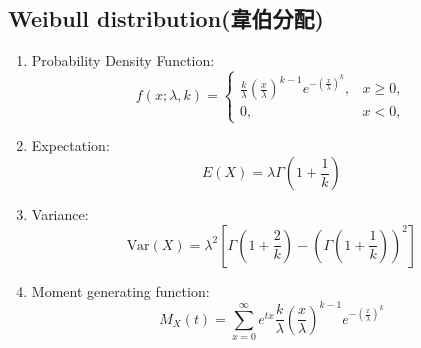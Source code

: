 \documentclass[12pt, a4paper]{article}
\begin{document}
\subsection{Weibull distribution(韋伯分配)}
\begin{enumerate}
\item Probability Density Function:$${\displaystyle f(x;\lambda ,k)={\begin{cases}{\frac {k}{\lambda }}\left({\frac {x}{\lambda }}\right)^{k-1}e^{-(\frac{x}{\lambda} )^{k}},&x\geq 0,\\0,&x<0,\end{cases}}}$$
\item Expectation:$$E(X) = \lambda \Gamma\left(1 + \frac{1}{k}\right)$$
\item Variance:$$\text{Var}(X) = \lambda^2 \left[\Gamma\left(1 + \frac{2}{k}\right) - \left(\Gamma\left(1 + \frac{1}{k}\right)\right)^2\right]$$
\item Moment generating function:$$M_X(t) = \sum_{x=0}^{\infty} e^{tx} \frac{k}{\lambda} \left(\frac{x}{\lambda}\right)^{k-1} e^{-(\frac{x}{\lambda})^k}$$
\end{enumerate}
\end{document}
